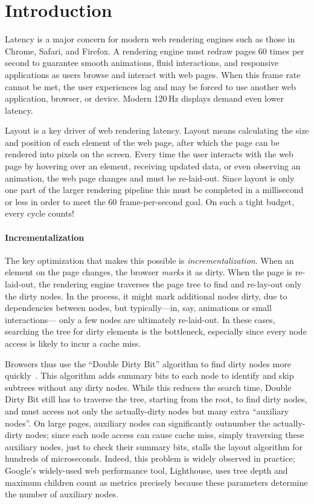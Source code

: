 
\section{Introduction}

Latency is a major concern for modern web rendering engines
  such as those in Chrome, Safari, and Firefox.
A rendering engine must redraw pages 60 times per second
  to guarantee smooth animations, fluid interactions,
  and responsive applications
  as users browse and interact with web pages.
When this frame rate cannot be met,
  the user experiences lag and may be forced to use another web application, browser, or device.
Modern 120\,Hz displays demand even lower latency.

Layout is a key driver of web rendering latency.
Layout means calculating the size and position
  of each element of the web page,
  after which the page can be rendered into pixels on the screen.
Every time the user interacts with the web page
  by hovering over an element,
  receiving updated data,
  or even observing an animation,
  the web page changes
   and must be re-laid-out.
Since layout is only one part of the larger rendering pipeline
  this must be completed in a millisecond or less
  in order to meet the 60 frame-per-second goal.
On such a tight budget, every cycle counts!

\paragraph{Incrementalization}
The key optimization that makes this possible
  is \emph{incrementalization}.
When an element on the page changes,
  the browser \emph{marks}  it as dirty.
When the page is re-laid-out,
  the rendering engine traverses the page tree
  to find and re-lay-out only the dirty nodes.
In the process, it might mark additional nodes dirty,
  due to dependencies between nodes,
  but typically---in, say, animations or small interactions---%
  only a few nodes are ultimately re-laid-out.
In these cases, searching the tree
  for dirty elements is the bottleneck,
  especially since every node access
  is likely to incur a cache miss.

Browsers thus use the ``Double Dirty Bit'' algorithm
  to find dirty nodes more quickly~\cite{wbe}.
This algorithm adds summary bits to each node
  to identify and skip subtrees without any dirty nodes.
While this reduces the search time,
  Double Dirty Bit still has to traverse the tree,
  starting from the root, to find dirty nodes,
  and must access not only the actually-dirty nodes
  but many extra ``auxiliary nodes''.
On large pages,
  auxiliary nodes can significantly outnumber
  the actually-dirty nodes;
  since  each node access can cause cache miss,
  simply traversing these auxiliary nodes,
  just to check their summary bits,
  stalls the layout algorithm for hundreds of microseconds.
Indeed, this problem is widely observed in practice;
  Google's widely-used web performance tool, Lighthouse,
  uses tree depth and maximum children count as metrics
  precisely because these parameters
  determine the number of auxiliary nodes.

